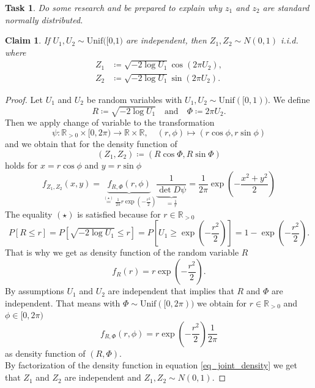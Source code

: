 \documentclass{scrartcl}
\newtheorem{task}{Task}
\newtheorem{claim}{Claim}
\begin{document}
	\begin{task}
		Do some research and be prepared to explain why $z_1$ and $z_2$ are standard normally distributed.
	\end{task}
	\begin{claim}
		If $U_1, U_2 \sim \textrm{Unif([0,1)}$ are independent, then $Z_1, Z_2 \sim N(0,1)$ i.i.d. where
		\begin{align}
			Z_1 &\coloneqq \sqrt{-2\log U_1}\cos(2\pi U_2), \\
			Z_2 &\coloneqq \sqrt{-2\log U_1}\sin(2\pi U_2).
		\end{align}
	\end{claim}
	\begin{proof}
		Let $U_1$ and $U_2$ be random variables with $U_1, U_2 \sim \textrm{Unif}([0,1))$. We define
		\begin{equation}
		R \coloneqq \sqrt{-2\log U_1} \quad \text{and} \quad \Phi \coloneqq 2\pi U_2.
		\end{equation}
		Then we apply change of variable to the transformation
		\begin{equation}
		\psi : \mathbb{R}_{>0} \times [0,2\pi) \to \mathbb{R} \times \mathbb{R}, \quad (r,\phi) \mapsto (r\cos\phi, r\sin\phi)
		\end{equation}
		and we obtain that for the density function of
		\begin{equation}
		(Z_1, Z_2) \coloneqq (R\cos\Phi, R\sin\Phi)
		\end{equation}
		holds for $x = r\cos\phi$ and $y = r\sin\phi$
		\begin{equation}
		f_{Z_1,Z_2}(x,y) = \underbrace{f_{R,\Phi}(r,\phi)}_{\overset{(\star)}{=}\frac{1}{2\pi} r\exp\left(-\frac{r^2}{2}\right)} \underbrace{\frac{1}{\det D\psi}}_{=\frac{1}{r}} = \frac{1}{2\pi}\exp\left(-\frac{x^2+y^2}{2}\right)
		\label{eq_joint_density}
		\end{equation}
		The equality $(\star)$ is satisfied because for $r\in\mathbb{R}_{>0}$
		\begin{equation}
			P[R\leq r] = P[\sqrt{-2\log U_1} \leq r] = P\left[U_1\geq \exp\left(-\frac{r^2}{2}\right)\right] = 1 - \exp\left(-\frac{r^2}{2}\right).
		\end{equation}
		That is why we get as density function of the random variable $R$
		\begin{equation}
			f_R(r) = r\exp\left(-\frac{r^2}{2}\right).
		\end{equation}
		By assumptions $U_1$ and $U_2$ are independent that implies that $R$ and $\Phi$ are independent. That means with $\Phi\sim\textrm{Unif}([0,2\pi))$ we obtain for $r\in\mathbb{R}_{>0}$ and $\phi\in[0,2\pi)$
		\begin{equation}
			f_{R,\Phi}(r,\phi) = r\exp\left(-\frac{r^2}{2}\right)\frac{1}{2\pi}
		\end{equation}
		as density function of $(R,\Phi)$. \\
		By factorization of the density function in equation \ref{eq_joint_density} we get that $Z_1$ and $Z_2$ are independent and $Z_1, Z_2 \sim N(0,1)$.
	\end{proof}
	
\end{document}
